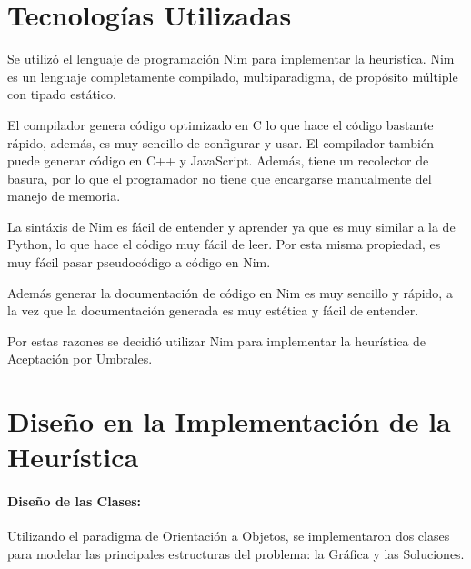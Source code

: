 \documentclass[12pt]{article}
\begin{document}
	\section{Tecnologías Utilizadas}
	
	Se utilizó el lenguaje de programación Nim para implementar la heurística. Nim es un
	lenguaje completamente compilado, multiparadigma, de propósito múltiple con tipado
	estático.
	
	El compilador genera código optimizado en C lo que hace el código bastante rápido, además, es muy sencillo de configurar y usar. El compilador también puede generar
	código en C++ y JavaScript.
	Además, tiene un recolector de basura, por lo que el programador no tiene que
	encargarse manualmente del manejo de memoria.
	
	La sintáxis de Nim es fácil de entender y aprender ya que es muy similar a la de Python, lo que hace el código muy fácil de leer. Por esta misma propiedad, es muy
	fácil pasar pseudocódigo a código en Nim.
	
	Además generar la documentación de código en Nim es muy sencillo y rápido, a la vez que la documentación generada es muy estética y fácil de entender.
	
	Por estas razones se decidió utilizar Nim para implementar la heurística de 
	Aceptación por Umbrales.
	
	
	\section{Diseño en la Implementación de la Heurística}
	\paragraph{Diseño de las Clases:}
	Utilizando el paradigma de Orientación a Objetos, se implementaron dos clases para 
	modelar las principales estructuras del problema: la Gráfica y las Soluciones.
	
\end{document}
